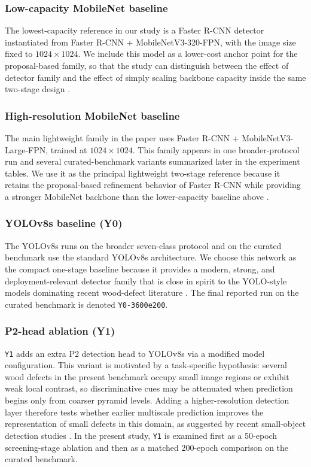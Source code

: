 \documentclass[10pt,a4paper]{article}
\begin{document}
\subsubsection{Low-capacity MobileNet baseline}
The lowest-capacity reference in our study is a Faster R-CNN detector instantiated from Faster R-CNN + MobileNetV3-320-FPN,  with the image size fixed to $1024 \times 1024$. We include this model as a lower-cost anchor point for the proposal-based family, so that the study can distinguish between the effect of detector family and the effect of simply scaling backbone capacity inside the same two-stage design \citep{faster_rcnn,mobilenetv3}.

\subsubsection{High-resolution MobileNet baseline}
The main lightweight family in the paper uses Faster R-CNN + MobileNetV3-Large-FPN, trained at $1024 \times 1024$. This family appears in one broader-protocol run and several curated-benchmark variants summarized later in the experiment tables. We use it as the principal lightweight two-stage reference because it retains the proposal-based refinement behavior of Faster R-CNN while providing a stronger MobileNet backbone than the lower-capacity baseline above \citep{faster_rcnn,mobilenetv3}.

\subsubsection{YOLOv8s baseline (Y0)}
The YOLOv8s runs on the broader seven-class protocol and on the curated benchmark use the standard YOLOv8s architecture. We choose this network as the compact one-stage baseline because it provides a modern, strong, and deployment-relevant detector family that is close in spirit to the YOLO-style models dominating recent wood-defect literature \citep{odca_yolo,bpn_yolo,sim_yolo,fdd_yolo}. The final reported run on the curated benchmark is denoted \texttt{Y0-3600e200}.

\subsubsection{P2-head ablation (Y1)}
\texttt{Y1} adds an extra P2 detection head to YOLOv8s via a modified model configuration. This variant is motivated by a task-specific hypothesis: several wood defects in the present benchmark occupy small image regions or exhibit weak local contrast, so discriminative cues may be attenuated when prediction begins only from coarser pyramid levels. Adding a higher-resolution detection layer therefore tests whether earlier multiscale prediction improves the representation of small defects in this domain, as suggested by recent small-object detection studies \citep{wei_2024_smallreview,hua_2025_smallsurvey,cmc_insulator_small}. In the present study, \texttt{Y1} is examined first as a 50-epoch screening-stage ablation and then as a matched 200-epoch comparison on the curated benchmark.
\end{document}
